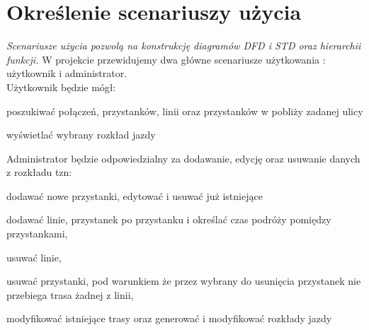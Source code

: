 \section{Określenie scenariuszy użycia}
\textit{Scenariusze użycia pozwolą na konstrukcję diagramów
DFD i STD oraz hierarchii funkcji.}
W projekcie przewidujemy dwa główne scenariusze użytkowania : użytkownik i administrator.\\
Użytkownik będzie mógł:
\begin{list}{*}{}
\item poszukiwać połączeń, przystanków, linii oraz przystanków w pobliży zadanej ulicy
\item wyświetlać wybrany rozkład jazdy
\end{list}

Administrator będzie odpowiedzialny za dodawanie, edycję oraz usuwanie danych z rozkładu tzn:
\begin{list}{*}{}
\item dodawać nowe przystanki, edytować i usuwać już istniejące
\item dodawać linie, przystanek po przystanku i określać czas podróży pomiędzy przystankami,
\item usuwać linie,
\item usuwać przystanki, pod warunkiem że przez wybrany do usunięcia przystanek nie przebiega trasa żadnej z linii,
\item modyfikować istniejące trasy oraz generować i modyfikować rozkłady jazdy
\end{list}


